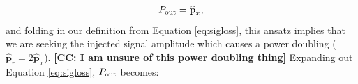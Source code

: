 \documentclass[preprint2,numberedappendix,tighten]{aastex6}  %
\newcommand{\x}{\mathbf{x}}
\newcommand{\f}{\mathbf{f}}
\newcommand{\s}{\mathbf{s}}
\newcommand{\p}{\mathbf{p}}
\newcommand{\phat}{\widehat{\mathbf{p}}}
\newcommand{\cc}[1]{{\color{purple} \textbf{[CC: #1]}}}
\begin{document}
\begin{equation}
P_{\rm out} = \widehat{\textbf{p}}_{x} \label{eqn:anzatz},
\end{equation}
and folding in our definition from Equation \eqref{eq:sigloss}, this ansatz implies that we are seeking the injected 
signal amplitude which causes a power doubling ($\phat_r = 2 \phat_x$). \cc{I am unsure of this power doubling thing} Expanding out Equation \eqref{eq:sigloss}, $P_{\rm out}$ becomes:

%
%
%
\end{document}
